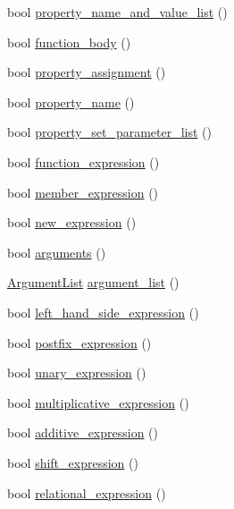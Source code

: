 \begin{DoxyCompactItemize}
\item 
bool \hyperlink{class_expression_parser_a229ec321a0c9b1263938b0480c33074c}{property\+\_\+name\+\_\+and\+\_\+value\+\_\+list} ()
\item 
bool \hyperlink{class_expression_parser_a0bce636277311f94895ce151297593a7}{function\+\_\+body} ()
\item 
bool \hyperlink{class_expression_parser_a1007502edbff2d329179eb082bb051f8}{property\+\_\+assignment} ()
\item 
bool \hyperlink{class_expression_parser_adf22d58a99fff34638009d9969e37694}{property\+\_\+name} ()
\item 
bool \hyperlink{class_expression_parser_af081f66a5621c42830d478fb4ee2c557}{property\+\_\+set\+\_\+parameter\+\_\+list} ()
\item 
bool \hyperlink{class_expression_parser_ac202f343a5842f9ff1c7ccc4ba070c8c}{function\+\_\+expression} ()
\item 
bool \hyperlink{class_expression_parser_ae2bd534865d04c37536be99454de581c}{member\+\_\+expression} ()
\item 
bool \hyperlink{class_expression_parser_a4d411351ef0c0345953d08ee209b4600}{new\+\_\+expression} ()
\item 
bool \hyperlink{class_expression_parser_a3aad766078d08da22fa13aba0b9407bf}{arguments} ()
\item 
\hyperlink{ast_8h_a31fcc1ca3d32657e8eb6f1433e97d2c9}{Argument\+List} \hyperlink{class_expression_parser_ae73453aca4a9ed6b79e797ac142fe11d}{argument\+\_\+list} ()
\item 
bool \hyperlink{class_expression_parser_a78c6db4376ac94f6f22a7b9d3ba480e0}{left\+\_\+hand\+\_\+side\+\_\+expression} ()
\item 
bool \hyperlink{class_expression_parser_ae6351ed31aab652e3c739a573c6708a1}{postfix\+\_\+expression} ()
\item 
bool \hyperlink{class_expression_parser_a0e2bc482f634c7d82d56aaea65e84e83}{unary\+\_\+expression} ()
\item 
bool \hyperlink{class_expression_parser_a153a0477fb1e983c202ca1228b8264ef}{multiplicative\+\_\+expression} ()
\item 
bool \hyperlink{class_expression_parser_a65cea2c22813de2b19fca563c0ba9f46}{additive\+\_\+expression} ()
\item 
bool \hyperlink{class_expression_parser_a89891cf1048fbf1f5cfc3a6d6517d9ad}{shift\+\_\+expression} ()
\item 
bool \hyperlink{class_expression_parser_a4fb90288abf0bdeb862ae2850951cb6a}{relational\+\_\+expression} ()

\end{DoxyCompactItemize}
